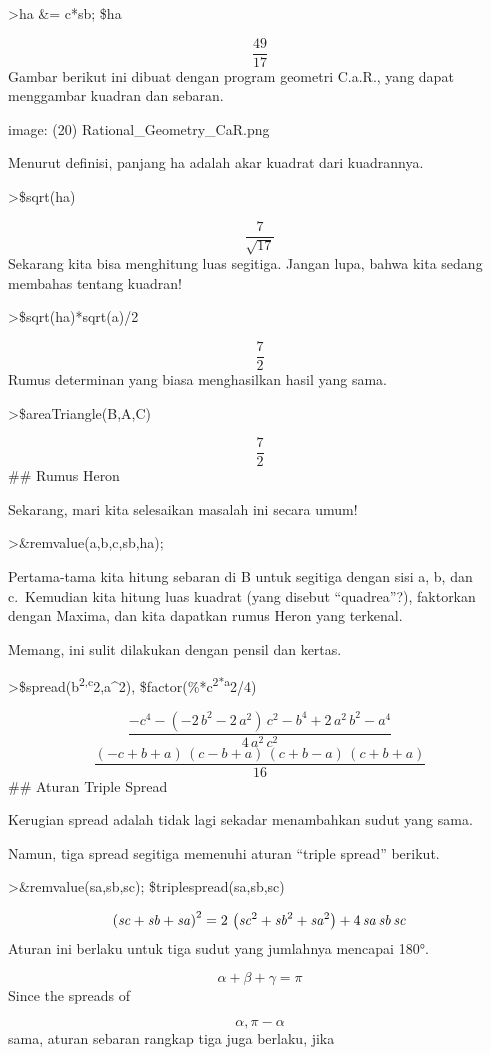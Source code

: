 \documentclass[
]{book}
\begin{document}
\textgreater ha \&= c*sb; \$ha

\[\frac{49}{17}\]Gambar berikut ini dibuat dengan program geometri C.a.R., yang dapat menggambar kuadran dan sebaran.

image: (20) Rational\_Geometry\_CaR.png

Menurut definisi, panjang ha adalah akar kuadrat dari kuadrannya.

\textgreater\$sqrt(ha)

\[\frac{7}{\sqrt{17}}\]Sekarang kita bisa menghitung luas segitiga. Jangan lupa, bahwa kita sedang membahas tentang kuadran!

\textgreater\$sqrt(ha)*sqrt(a)/2

\[\frac{7}{2}\]Rumus determinan yang biasa menghasilkan hasil yang sama.

\textgreater\$areaTriangle(B,A,C)

\[\frac{7}{2}\] \#\# Rumus Heron

Sekarang, mari kita selesaikan masalah ini secara umum!

\textgreater\&remvalue(a,b,c,sb,ha);

Pertama-tama kita hitung sebaran di B untuk segitiga dengan sisi a, b, dan c.~Kemudian kita hitung luas kuadrat (yang disebut ``quadrea''?), faktorkan dengan Maxima, dan kita dapatkan rumus Heron yang terkenal.

Memang, ini sulit dilakukan dengan pensil dan kertas.

\textgreater\$spread(b\textsuperscript{2,c}2,a\^{}2), \$factor(\%*c\textsuperscript{2*a}2/4)

\[\frac{-c^4-\left(-2\,b^2-2\,a^2\right)\,c^2-b^4+2\,a^2\,b^2-a^4}{4\,a^2\,c^2}\] \[\frac{\left(-c+b+a\right)\,\left(c-b+a\right)\,\left(c+b-a\right)\,\left(c+b+a\right)}{16}\] \#\# Aturan Triple Spread

Kerugian spread adalah tidak lagi sekadar menambahkan sudut yang sama.

Namun, tiga spread segitiga memenuhi aturan ``triple spread'' berikut.

\textgreater\&remvalue(sa,sb,sc); \$triplespread(sa,sb,sc)

\[\left({\it sc}+{\it sb}+{\it sa}\right)^2=2\,\left({\it sc}^2+{\it sb}^2+{\it sa}^2\right)+4\,{\it sa}\,{\it sb}\,{\it sc}\]Aturan ini berlaku untuk tiga sudut yang jumlahnya mencapai 180°.

\[\alpha+\beta+\gamma=\pi\]Since the spreads of

\[\alpha, \pi-\alpha\]sama, aturan sebaran rangkap tiga juga berlaku, jika
\end{document}
